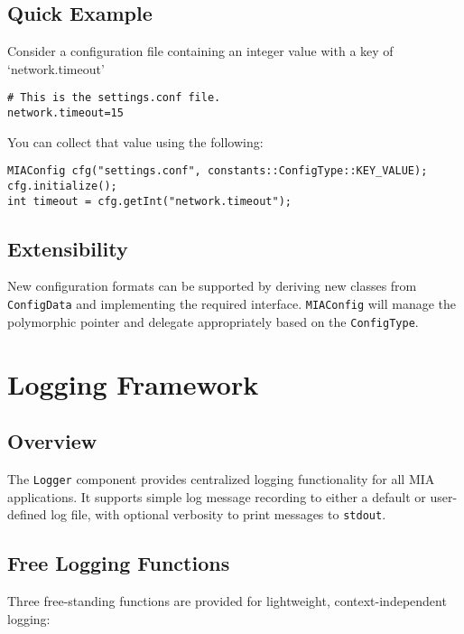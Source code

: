 \subsection{Quick Example}

Consider a configuration file containing an integer value with a key of `network.timeout'
\begin{lstlisting}[style=cppstyle]
# This is the settings.conf file.
network.timeout=15
\end{lstlisting}
You can collect that value using the following: 
\begin{lstlisting}[style=cppstyle]
MIAConfig cfg("settings.conf", constants::ConfigType::KEY_VALUE);
cfg.initialize();
int timeout = cfg.getInt("network.timeout");
\end{lstlisting}

\subsection{Extensibility}

New configuration formats can be supported by deriving new classes from \texttt{ConfigData} and implementing the required interface. \texttt{MIAConfig} will manage the polymorphic pointer and delegate appropriately based on the \texttt{ConfigType}.
























\section{Logging Framework}
\label{sec:logging-Framework}

\subsection{Overview}
The \texttt{Logger} component provides centralized logging functionality for all MIA applications. It supports simple log message recording to either a default or user-defined log file, with optional verbosity to print messages to \texttt{stdout}.

\subsection{Free Logging Functions}
Three free-standing functions are provided for lightweight, context-independent logging:

